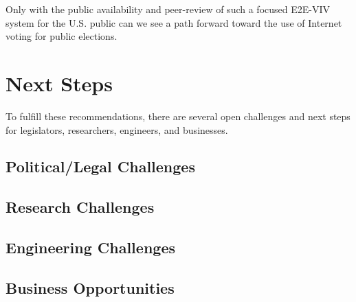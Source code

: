 Only with the public availability and peer-review of such a focused
E2E-VIV system for the U.S. public can we see a path forward
toward the use of Internet voting for public elections.

\section{Next Steps}
\label{sec:next-steps}

To fulfill these recommendations, there are several open challenges
and next steps for legislators, researchers, engineers, and
businesses.

\subsection{Political/Legal Challenges}
\subsection{Research Challenges}
\subsection{Engineering Challenges}
\subsection{Business Opportunities}
